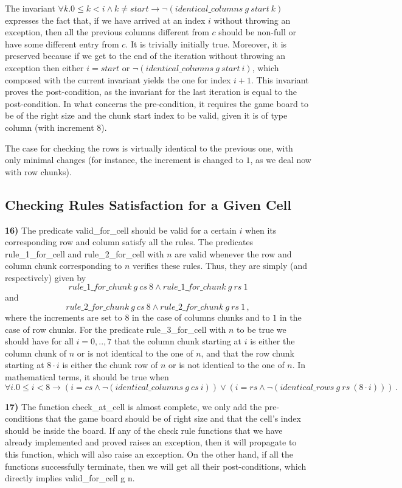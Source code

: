 \documentclass[]{StandardTemplate}
\begin{document}
The invariant $ \forall k. 0 \leq k < i \land k \neq start \to \neg (identical\_columns~g~start~k) $ expresses the fact that, if we have arrived at an index $ i $ without throwing an exception, then all the previous columns different from $ c $ should be non-full or have some different entry from $ c $. It is trivially initially true. Moreover, it is preserved because if we get to the end of the iteration without throwing an exception then either $ i = start $ or $  \neg (identical\_columns~g~start~i) $, which composed with the current invariant yields the one for index $ i+1 $. This invariant proves the post-condition, as the invariant for the last iteration is equal to the post-condition. In what concerns the pre-condition, it requires the game board to be of the right size and the chunk start index to be valid, given it is of type column (with increment $ 8 $).

The case for checking the rows is virtually identical to the previous one, with only minimal changes (for instance, the increment is changed to $ 1 $, as we deal now with row chunks). 


\subsection{Checking Rules Satisfaction for a Given Cell}
\label{subsec:gc}

\textbf{16)} The predicate valid\_for\_cell should be valid for a certain $ i $ when its corresponding row and column satisfy all the rules. The predicates rule\_1\_for\_cell and rule\_2\_for\_cell with $ n $ are valid whenever the row and column chunk corresponding to $ n $ verifies these rules. Thus, they are simply (and respectively) given by \[
rule\_1\_for\_chunk~g~cs~8 \land rule\_1\_for\_chunk~g~rs~1
\]and \[
rule\_2\_for\_chunk~g~cs~8 \land rule\_2\_for\_chunk~g~rs~1
  \,,\] where the increments are set to $ 8 $ in the case of columns chunks and to $ 1 $ in the case of row chunks. For the predicate rule\_3\_for\_cell with $ n $ to be true we should have for all $ i=0,..,7 $ that the column chunk starting at $ i $ is either the column chunk of $ n $ or is not identical to the one of $ n $, and that the row chunk starting at $ 8 \cdot i $ is either the chunk row of $ n $ or is not identical to the one of $ n $. In mathematical terms, it should be true when \[
\forall i. 0 \leq i < 8 \to (i = cs \land \neg(identical\_columns~g~cs~i))\lor(i = rs \land \neg(identical\_rows~g~rs~(8 \cdot i)))
\,.\]

\textbf{17)} The function check\_at\_cell is almost complete, we only add the pre-conditions that the game board should be of right size and that the cell's index should be inside the board. If any of the check rule functions that we have already implemented and proved raises an exception, then it will propagate to this function, which will also raise an exception. On the other hand, if all the functions successfully terminate, then we will get all their post-conditions, which directly implies valid\_for\_cell g n.
\end{document}
